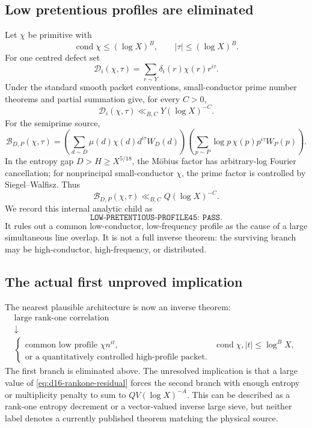 \documentclass[11pt]{article}
\theoremstyle{definition}
\newcommand{\1}{\mathbf 1}
\begin{document}
\subsection{Low pretentious profiles are eliminated}
Let $\chi$ be primitive with
\[
 \operatorname{cond}\chi\le(\log X)^B,\qquad |\tau|\le(\log X)^B.
\]
For one centred defect set
\[
 \mathcal D_i(\chi,\tau)
 =\sum_{r\sim Y}\delta_i(r)\chi(r)r^{i\tau}.
\]
Under the standard smooth packet conventions, small-conductor prime number
theorems and partial summation give, for every $C>0$,
\[
 \mathcal D_i(\chi,\tau)\ll_{B,C}Y(\log X)^{-C}.
\]
For the semiprime source,
\[
 \mathcal B_{D,P}(\chi,\tau)
 =
 \left(\sum_{d\sim D}\mu(d)\chi(d)d^{i\tau}W_D(d)\right)
 \left(\sum_{p\sim P}\log p\,\chi(p)p^{i\tau}W_P(p)\right).
\]
In the entropy gap $D>H\ge X^{5/18}$, the M\"obius factor has
arbitrary-log Fourier cancellation; for nonprincipal small-conductor $\chi$,
the prime factor is controlled by Siegel--Walfisz.  Thus
\[
 \mathcal B_{D,P}(\chi,\tau)\ll_{B,C}Q(\log X)^{-C}.
\]
We record this internal analytic child as
\[
 \boxed{\texttt{LOW-PRETENTIOUS-PROFILE45: PASS}}.
\]
It rules out a common low-conductor, low-frequency profile as the cause of a
large simultaneous line overlap.  It is not a full inverse theorem: the
surviving branch may be high-conductor, high-frequency, or distributed.

\subsection{The actual first unproved implication}
The nearest plausible architecture is now an inverse theorem:
\[
\boxed{
\begin{array}{c}
\text{large rank-one correlation}\\
\downarrow\\
\begin{cases}
\text{common low profile } \chi n^{it},&
 \operatorname{cond}\chi,|t|\le\log^B X,\\
\text{or a quantitatively controlled high-profile packet.}
\end{cases}
\end{array}}
\]
The first branch is eliminated above.  The unresolved implication is that a
large value of \eqref{eq:d16-rankone-residual} forces the second branch with
enough entropy or multiplicity penalty to sum to
$QV(\log X)^{-A}$.  This can be described as a rank-one entropy decrement or a
vector-valued inverse large sieve, but neither label denotes a currently
published theorem matching the physical source.
\end{document}
